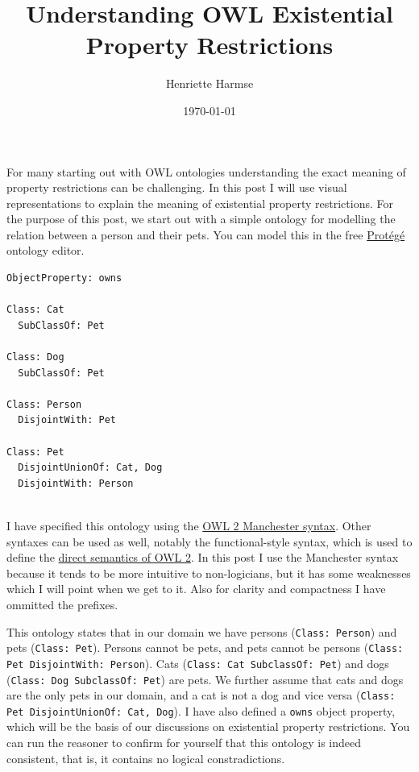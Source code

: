 \documentclass{amsart}
\title{Understanding OWL Existential Property Restrictions}
\author{Henriette Harmse}
\date{\today}
\begin{document}
  \maketitle
  
  For many starting out with OWL ontologies understanding the exact meaning of property restrictions can be challenging. In this post I will use visual representations to explain the meaning of existential property restrictions. For the purpose of this post, we start out with a simple ontology for modelling the relation between a person and their pets.  You can model this in the free \href{https://protege.stanford.edu/products.php}{Prot\'{e}g\'{e}} ontology editor.
  
\begin{small}
\begin{verbatim} 
ObjectProperty: owns
        
Class: Cat
  SubClassOf: Pet
    
Class: Dog
  SubClassOf: Pet
    
Class: Person
  DisjointWith: Pet
        
Class: Pet
  DisjointUnionOf: Cat, Dog
  DisjointWith: Person
      
\end{verbatim}
\end{small}  

I have specified this ontology using the \href{http://www.w3.org/TR/owl2-manchester-syntax/}{OWL 2 Manchester syntax}. Other syntaxes can be used as well, notably the functional-style syntax, which is used to define the \href{https://www.w3.org/TR/owl2-direct-semantics/}{direct semantics of OWL 2}. In this post I use the Manchester syntax because it tends to be more intuitive to non-logicians, but it has some weaknesses which I will point when we get to it. Also for clarity and compactness I have ommitted the prefixes.

This ontology states that in our domain we have persons (\texttt{Class: Person}) and pets (\texttt{Class: Pet}). Persons cannot be pets, and pets cannot be persons (\texttt{Class: Pet DisjointWith: Person}). Cats (\texttt{Class: Cat SubclassOf: Pet}) and dogs (\texttt{Class: Dog SubclassOf: Pet}) are pets. We further assume that cats and dogs are the only pets in our domain, and a cat is not a dog and vice versa (\texttt{Class: Pet  DisjointUnionOf: Cat, Dog}). I have also defined a \texttt{owns} object property, which will be the basis of our discussions on existential property restrictions. You can run the reasoner to confirm for yourself that this ontology is indeed consistent, that is, it contains no logical constradictions.
  
\end{document}
